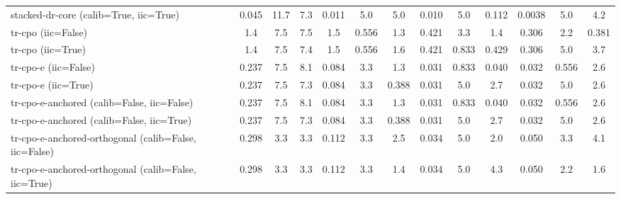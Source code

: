 \begin{table}[htbp]
\begin{tabular}{l|cccccccccccc}
stacked-dr-core (calib=True, iic=True) & 0.045 & 11.7 & 7.3 & 0.011 & 5.0 & 5.0 & 0.010 & 5.0 & 0.112 & 0.0038 & 5.0 & 4.2 \\
tr-cpo (iic=False) & 1.4 & 7.5 & 7.5 & 1.5 & 0.556 & 1.3 & 0.421 & 3.3 & 1.4 & 0.306 & 2.2 & 0.381 \\
tr-cpo (iic=True) & 1.4 & 7.5 & 7.4 & 1.5 & 0.556 & 1.6 & 0.421 & 0.833 & 0.429 & 0.306 & 5.0 & 3.7 \\
tr-cpo-e (iic=False) & 0.237 & 7.5 & 8.1 & 0.084 & 3.3 & 1.3 & 0.031 & 0.833 & 0.040 & 0.032 & 0.556 & 2.6 \\
tr-cpo-e (iic=True) & 0.237 & 7.5 & 7.3 & 0.084 & 3.3 & 0.388 & 0.031 & 5.0 & 2.7 & 0.032 & 5.0 & 2.6 \\
tr-cpo-e-anchored (calib=False, iic=False) & 0.237 & 7.5 & 8.1 & 0.084 & 3.3 & 1.3 & 0.031 & 0.833 & 0.040 & 0.032 & 0.556 & 2.6 \\
tr-cpo-e-anchored (calib=False, iic=True) & 0.237 & 7.5 & 7.3 & 0.084 & 3.3 & 0.388 & 0.031 & 5.0 & 2.7 & 0.032 & 5.0 & 2.6 \\
tr-cpo-e-anchored-orthogonal (calib=False, iic=False) & 0.298 & 3.3 & 3.3 & 0.112 & 3.3 & 2.5 & 0.034 & 5.0 & 2.0 & 0.050 & 3.3 & 4.1 \\
tr-cpo-e-anchored-orthogonal (calib=False, iic=True) & 0.298 & 3.3 & 3.3 & 0.112 & 3.3 & 1.4 & 0.034 & 5.0 & 4.3 & 0.050 & 2.2 & 1.6 \\
\bottomrule
\end{tabular}
\end{table}